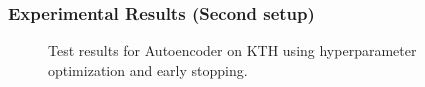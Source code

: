   \begin{frame}
   \frametitle{Experimental Results (Second setup)}
   
   \begin{figure}[H]
   \centering
   \qquad
   \qquad
   \caption{Test results for Autoencoder on KTH using hyperparameter optimization and early stopping.}
   \label{figure::prednet_mnist_results}
  \end{figure}
  
  \end{frame}